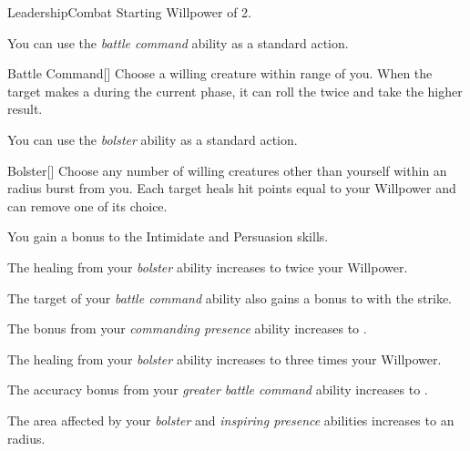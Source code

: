     \begin{feat}{Leadership}{Combat}
        \featpre Starting Willpower of 2.

         You can use the \textit{battle command} ability as a standard action.
        \begin{freeability}{Battle Command}[]
            Choose a willing creature within \rngmed range of you.
            When the target makes a  during the current phase, it can roll the  twice and take the higher result.
        \end{freeability}

         You can use the \textit{bolster} ability as a standard action.
        \begin{apability}{Bolster}[]
            Choose any number of willing creatures other than yourself within an \areamed radius burst from you.
            Each target heals hit points equal to your Willpower and can remove one  of its choice.
        \end{apability}

         You gain a  bonus to the Intimidate and Persuasion skills.

         The healing from your \textit{bolster} ability increases to twice your Willpower.

         The target of your \textit{battle command} ability also gains a  bonus to  with the strike.

         The bonus from your \textit{commanding presence} ability increases to .

         The healing from your \textit{bolster} ability increases to three times your Willpower.

         The accuracy bonus from your \textit{greater battle command} ability increases to .

         The area affected by your \textit{bolster} and \textit{inspiring presence} abilities increases to an \areahuge radius.
    \end{feat}

